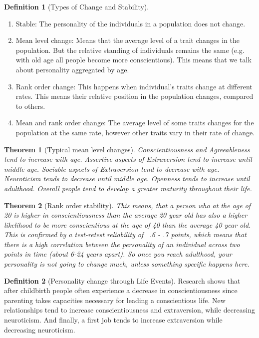 \documentclass{article}
\newtheorem{theorem}{Theorem}
\theoremstyle{definition}
\newtheorem{definition}{Definition}
\theoremstyle{Solution}
\begin{document}
\begin{definition}[Types of Change and Stability]
\begin{enumerate}
	\item Stable: The personality of the individuals in a population does not change.
	\item Mean level change: Means that the average level of a trait changes in the population. But the relative standing of individuals remains the same (e.g. with old age all people become more conscientious). This means that we talk about personality aggregated by age.
	\item Rank order change: This happens when individual's traits change at different rates. This means their relative position in the population changes, compared to others.
	\item Mean and rank order change: The average level of some traits changes for the population at the same rate, however other traits vary in their rate of change.
\end{enumerate}
\end{definition}

\begin{theorem}[Typical mean level changes]
Conscientiousness and Agreeableness tend to increase with age. Assertive aspects of Extraversion tend to increase until middle age. Sociable aspects of Extraversion tend to decrease with age. Neuroticism tends to decrease until middle age. Openness tends to increase until adulthood. Overall people tend to develop a greater maturity throughout their life.
\end{theorem}

\begin{theorem}[Rank order stability]
This means, that a person who at the age of 20 is higher in conscientiousness than the average 20 year old has also a higher likelihood to be more conscientious at the age of 40 than the average 40 year old. This is confirmed by a test-retest reliability of ~.6 - .7 points, which means that there is a high correlation between the personality of an individual across two points in time (about 6-24 years apart). So once you reach adulthood, your personality is not going to change much, unless something specific happens here.
\end{theorem}

\begin{definition}[Personality change through Life Events]
Research shows that after childbirth people often experience a decrease in conscientiousness since parenting takes capacities necessary for leading a conscientious life. New relationships tend to increase conscientiousness and extraversion, while decreasing neuroticism. And finally, a first job tends to increase extraversion while decreasing neuroticism.
\end{definition}
\end{document}

